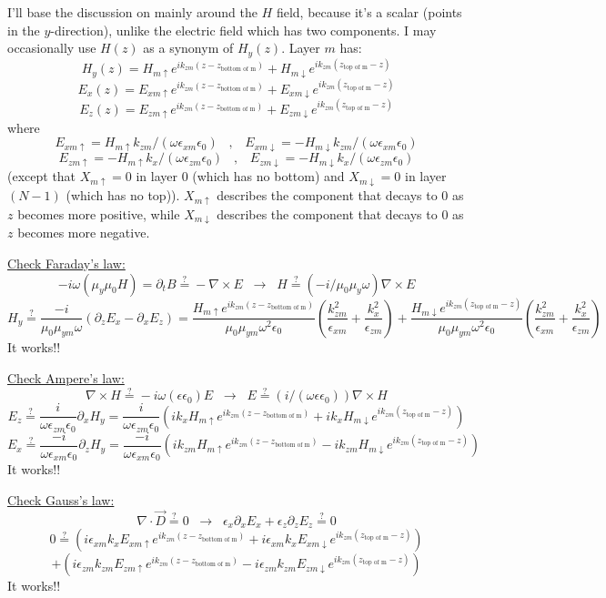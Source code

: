 \documentclass[12pt]{article}
\renewcommand{\(}{\left(}
\renewcommand{\)}{\right)}
\newcommand{\ul}{\underline}
\newcommand{\e}{\epsilon}
\begin{document}
I'll base the discussion on mainly around the $H$ field, because it's a scalar (points in the $y$-direction), unlike the electric field which has two components. I may occasionally use $H(z)$ as a synonym of $H_y(z)$. Layer $m$ has:
$$H_y(z) = H_{m\uparrow} e^{i k_{zm} (z-z_{\text{bottom of m}})} + H_{m\downarrow} e^{i k_{zm} (z_{\text{top of m}} - z)}$$
$$E_x(z) = E_{xm\uparrow} e^{i k_{zm} (z-z_{\text{bottom of m}})} + E_{xm\downarrow} e^{i k_{zm} (z_{\text{top of m}} - z)}$$
$$E_z(z) = E_{zm\uparrow} e^{i k_{zm} (z-z_{\text{bottom of m}})} + E_{zm\downarrow} e^{i k_{zm} (z_{\text{top of m}} - z)}$$
where
$$E_{xm\uparrow} = H_{m\uparrow} k_{zm} / (\omega \e_{xm} \e_0) \;\;\; , \;\;\; E_{xm\downarrow} = -H_{m\downarrow} k_{zm} / (\omega \e_{xm} \e_0)$$
$$E_{zm\uparrow} = -H_{m\uparrow} k_x / (\omega \e_{zm} \e_0) \;\;\; , \;\;\; E_{zm\downarrow} = -H_{m\downarrow} k_x / (\omega \e_{zm} \e_0)$$
(except that $X_{m\uparrow}=0$ in layer 0 (which has no bottom) and $X_{m\downarrow}=0$ in layer $(N-1)$ (which has no top)). $X_{m\uparrow}$ describes the component that decays to 0 as $z$ becomes more positive, while $X_{m\downarrow}$ describes the component that decays to 0 as $z$ becomes more negative.

\ul{Check Faraday's law:}
$$-i\omega (\mu_y \mu_0 H) = \partial_t B \stackrel{?}{=} -\nabla \times E \;\; \rightarrow \;\; H \stackrel{?}{=} (-i/\mu_0\mu_y\omega)\nabla \times E$$
$$H_y \stackrel{?}{=} \frac{-i}{\mu_0\mu_{ym}\omega} \(\partial_z E_x - \partial_x E_z\) = \frac{H_{m\uparrow}e^{i k_{zm} (z-z_{\text{bottom of m}})}}{\mu_0 \mu_{ym} \omega^2 \e_0}(\frac{k_{zm}^2}{\e_{xm}} + \frac{k_x^2}{\e_{zm}}) + \frac{H_{m\downarrow} e^{i k_{zm} (z_{\text{top of m}} - z)}}{\mu_0\mu_{ym}\omega^2\e_0}(\frac{k_{zm}^2}{\e_{xm}} + \frac{k_x^2}{\e_{zm}}) $$
It works!!

\ul{Check Ampere's law:}
$$\nabla \times H \stackrel{?}{=} -i \omega (\e \e_0) E \;\; \rightarrow \;\; E \stackrel{?}{=} (i/(\omega \e \e_0)) \nabla\times H$$
$$E_z \stackrel{?}{=} \frac{i}{\omega \e_{zm} \e_0} \partial_x H_y = \frac{i}{\omega \e_{zm} \e_0} \left( i k_x H_{m\uparrow} e^{i k_{zm} (z-z_{\text{bottom of m}})} + i k_x H_{m\downarrow} e^{i k_{zm} (z_{\text{top of m}} - z)}\right)$$
$$E_x \stackrel{?}{=} \frac{-i}{\omega \e_{xm} \e_0} \partial_z H_y = \frac{-i}{\omega \e_{xm} \e_0} \left( i k_{zm} H_{m\uparrow} e^{i k_{zm} (z-z_{\text{bottom of m}})} - i k_{zm} H_{m\downarrow} e^{i k_{zm} (z_{\text{top of m}} - z)}\right)$$
It works!!

\ul{Check Gauss's law:}
$$\nabla \cdot \vec{D} \stackrel{?}{=} 0 \;\; \rightarrow \;\; \e_x \partial_x E_x + \e_z \partial_z E_z \stackrel{?}{=} 0$$
$$ 0 \stackrel{?}{=} \( i \e_{xm} k_x E_{xm\uparrow} e^{i k_{zm} (z-z_{\text{bottom of m}})} + i \e_{xm} k_x E_{xm\downarrow} e^{i k_{zm} (z_{\text{top of m}} - z)} \)$$
$$ + \( i \e_{zm} k_{zm} E_{zm\uparrow} e^{i k_{zm} (z-z_{\text{bottom of m}})} - i \e_{zm} k_{zm} E_{zm\downarrow} e^{i k_{zm} (z_{\text{top of m}} - z)} \)$$
It works!!
\end{document}
